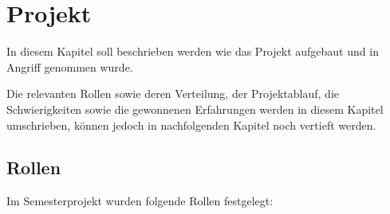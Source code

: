 \chapter{Projekt}

    In diesem Kapitel soll beschrieben werden wie das Projekt aufgebaut und in
    Angriff genommen wurde.

    Die relevanten Rollen sowie deren Verteilung, der Projektablauf, die
    Schwierigkeiten sowie die gewonnenen Erfahrungen werden in diesem Kapitel
    umschrieben, können jedoch in nachfolgenden Kapitel noch vertieft werden.

    \section{Rollen}
        \label{chap:rollen}

        Im Semesterprojekt wurden folgende Rollen festgelegt:

